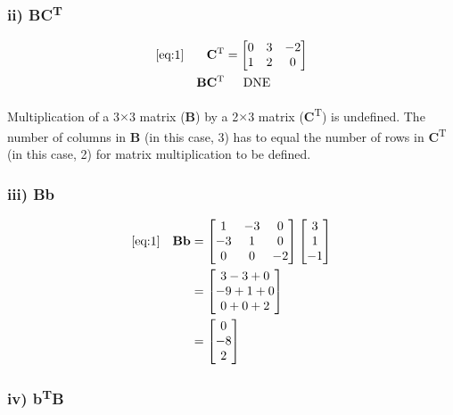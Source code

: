 \documentclass{article}
\begin{document}
\subsubsection*{ii) \textbf{BC}\textsuperscript{T}}

\begin{align}
    \label{eq:5}
    \eqref{eq:1} &&
    \textbf{C}\textsuperscript{T} &= \begin{bmatrix}
    0 & 3 & -2\\
    1 & 2 & 0
    \end{bmatrix}
    \\
    && \textbf{BC}\textsuperscript{T} & \text{\indent DNE}
\end{align}

Multiplication of a 3$\times$3 matrix (\textbf{B}) by a 2$\times$3 matrix (\textbf{C}\textsuperscript{T}) is undefined.  The number of columns in \textbf{B} (in this case, 3) has to equal the number of rows in \textbf{C}\textsuperscript{T} (in this case, 2) for matrix multiplication to be defined.

\subsubsection*{iii) \textbf{Bb}}

\begin{align}
    \label{eq:7}
    \eqref{eq:1} &&
    \textbf{Bb} &= \begin{bmatrix} 1 & -3 & 0\\ -3 & 1 & 0\\ 0 & 0 & -2 \end{bmatrix} \begin{bmatrix} 3\\ 1\\ -1 \end{bmatrix}
    \\
    \label{eq:8}
    && &= \begin{bmatrix}
    3-3+0\\
    -9+1+0\\
    0+0+2
    \end{bmatrix}
    \\
    \label{eq:9}
    && &= \begin{bmatrix}
    0\\
    -8\\
    2
    \end{bmatrix}
\end{align}

\subsubsection*{iv) \textbf{b}\textsuperscript{T}\textbf{B}}
\end{document}
